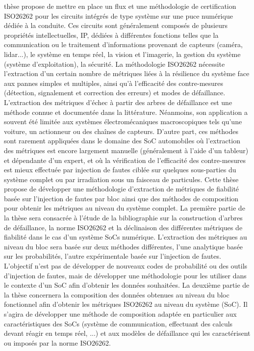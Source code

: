 \documentclass[12pt, notitlepage, twoside]{report}
\begin{document}
{thèse propose de mettre en place un flux et une méthodologie de certification ISO26262 pour les circuits intégrés de type système sur une puce numérique dédiée à la conduite. Ces circuits sont généralement composés de plusieurs propriétés intellectuelles, IP, dédiées à différentes fonctions telles que la communication ou le traitement d'informations provenant de capteurs (caméra, lidar...), le système en temps réel, la vision et l'imagerie, la gestion du système (système d'exploitation), la sécurité. La méthodologie ISO26262 nécessite l'extraction d'un certain nombre de métriques liées à la résilience du système face aux pannes simples et multiples, ainsi qu'à l'efficacité des contre-mesures (détection, signalement et correction des erreurs) et modes de défaillance. L'extraction des métriques d'échec à partir des arbres de défaillance est une méthode connue et documentée dans la littérature. Néanmoins, son application a souvent été limitée aux systèmes électromécaniques macroscopiques tels qu'une voiture, un actionneur ou des chaînes de capteurs. D'autre part, ces méthodes sont rarement appliquées dans le domaine des SoC automobiles où l'extraction des métriques est encore largement manuelle (généralement à l'aide d'un tableur) et dépendante d'un expert, et où la vérification de l'efficacité des contre-mesures est mieux effectuée par injection de fautes ciblée sur quelques sous-parties du système complet ou par irradiation sous un faisceau de particules. Cette thèse propose de développer une méthodologie d'extraction de métriques de fiabilité basée sur l'injection de fautes par bloc ainsi que des méthodes de composition pour obtenir les métriques au niveau du système complet. La première partie de la thèse sera consacrée à l'étude de la bibliographie sur la construction d'arbres de défaillance, la norme ISO26262 et la déclinaison des différentes métriques de fiabilité dans le cas d'un système SoCs numérique. L'extraction des métriques au niveau du bloc sera basée sur deux méthodes différentes, l'une analytique basée sur les probabilités, l'autre expérimentale basée sur l'injection de fautes. L'objectif n'est pas de développer de nouveaux codes de probabilité ou des outils d'injection de fautes, mais de développer une méthodologie pour les utiliser dans le contexte d'un SoC afin d'obtenir les données souhaitées. La deuxième partie de la thèse concernera la composition des données obtenues au niveau du bloc fonctionnel afin d'obtenir les métriques ISO26262 au niveau du système (SoC). Il s'agira de développer une méthode de composition adaptée en particulier aux caractéristiques des SoCs (système de communication, effectuant des calculs devant réagir en temps réel, ...) et aux modèles de défaillance qui les caractérisent ou imposés par la norme ISO26262.
}%
\end{document}
